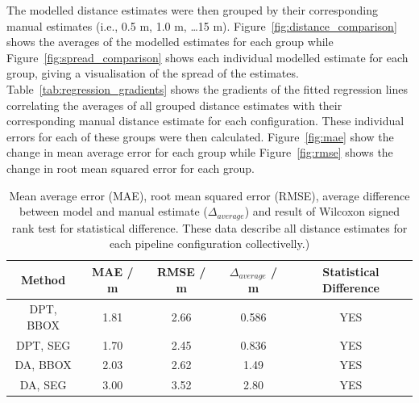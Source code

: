 The modelled distance estimates were then grouped by their corresponding manual estimates (i.e.,
0.5 m, 1.0 m, \ldots 15 m).
Figure~\ref{fig:distance_comparison} shows the averages of the modelled estimates for each
group while Figure~\ref{fig:spread_comparison} shows each individual modelled estimate for
each group, giving a visualisation of the spread of the estimates.
Table~\ref{tab:regression_gradients} shows the gradients of the fitted regression lines
correlating the averages of all grouped distance estimates with their corresponding manual
distance estimate for each configuration.
These individual errors for each of these groups were then calculated.
Figure~\ref{fig:mae} show the change in mean average error for each group while
Figure~\ref{fig:rmse} shows the change in root mean squared error for each group.

\vspace{1cm}

\begin{table}[htbp]
    \centering
    \caption{Mean average error (MAE), root mean squared error (RMSE), average difference between
    model and manual estimate ($\Delta_{average}$) and result of Wilcoxon signed rank test for
    statistical difference. These data describe all distance estimates for each pipeline
    configuration collectivelly.)}
    \label{tab:overall_errors}
    \begin{tabular}{ccccc}
        \textbf{Method} & \textbf{MAE / m} & \textbf{RMSE / m} & \textbf{$\Delta_{average}$ / m}
        & \textbf{Statistical Difference} \\
        \midrule
        DPT, BBOX & 1.81 & 2.66 & 0.586 & YES \\
        DPT, SEG  & 1.70 & 2.45 & 0.836 & YES \\
        DA, BBOX  & 2.03 & 2.62 & 1.49  & YES \\
        DA, SEG   & 3.00 & 3.52 & 2.80  & YES \\
    \end{tabular}
\end{table}

\clearpage

